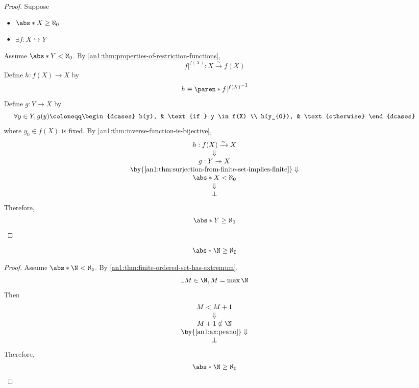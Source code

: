 \begin{proof}
  Suppose
  \begin{itemize}
    \item $\abs*{X} \geq \aleph_{0}$
    \item $\exists f: X \hookrightarrow Y$
  \end{itemize}
  Assume $\abs*{Y} < \aleph_{0}$. By \cref{an1:thm:properties-of-restriction-functions},
  \[
    f|^{f(X)}: X \xrightarrow{\sim} f(X)
  \]
  Define $h: f(X) \to X$ by
  \[
    h \equiv \paren*{f|^{f(X)}}^{-1}
  \]
  Define $g: Y \to X$ by
  \[
    \forall y \in Y, g(y) \coloneqq \begin{dcases}
      h(y),     & \text{if } y \in f(X) \\
      h(y_{0}), & \text{otherwise}
    \end{dcases}
  \]
  where $y_{0} \in f(X)$ is fixed. By \cref{an1:thm:inverse-function-is-bijective},
  \[
    \begin{array}{c}
      h: f(X) \xrightarrow{\sim} X                                             \\
      \Downarrow                                                               \\
      g: Y \twoheadrightarrow X                                                \\
      \by{\Cref{an1:thm:surjection-from-finite-set-implies-finite}} \Downarrow \\
      \abs*{X} < \aleph_{0}                                                    \\
      \Downarrow                                                               \\
      \bot
    \end{array}
  \]
  Therefore,
  \[
    \abs*{Y} \geq \aleph_{0}
  \]
\end{proof}

\begin{lemma} \label{an1:lem:N-is-infinite}
  \[
    \abs*{\N} \geq \aleph_{0}
  \]
\end{lemma}

\begin{proof}
  Assume $\abs*{\N} < \aleph_{0}$. By \cref{an1:thm:finite-ordered-set-has-extremum},
  \[
    \exists M \in \N, M = \max\N
  \]
  Then
  \[
    \begin{array}{c}
      M < M + 1                           \\
      \Downarrow                          \\
      M + 1 \notin \N                     \\
      \by{\Cref{an1:ax:peano}} \Downarrow \\
      \bot
    \end{array}
  \]
  Therefore,
  \[
    \abs*{\N} \geq \aleph_{0}
  \]
\end{proof}

